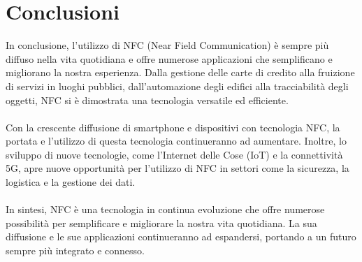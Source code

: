 \documentclass[a4paper,11pt]{report}
\begin{document}
\chapter{Conclusioni}
In conclusione, l'utilizzo di NFC (Near Field Communication) è sempre più diffuso nella vita quotidiana e offre numerose applicazioni che semplificano e migliorano la nostra esperienza. Dalla gestione delle carte di credito alla fruizione di servizi in luoghi pubblici, dall'automazione degli edifici alla tracciabilità degli oggetti, NFC si è dimostrata una tecnologia versatile ed efficiente.\\\\ Con la crescente diffusione di smartphone e dispositivi con tecnologia NFC, la portata e l'utilizzo di questa tecnologia continueranno ad aumentare. Inoltre, lo sviluppo di nuove tecnologie, come l'Internet delle Cose (IoT) e la connettività 5G, apre nuove opportunità per l'utilizzo di NFC in settori come la sicurezza, la logistica e la gestione dei dati.\\\\ In sintesi, NFC è una tecnologia in continua evoluzione che offre numerose possibilità per semplificare e migliorare la nostra vita quotidiana. La sua diffusione e le sue applicazioni continueranno ad espandersi, portando a un futuro sempre più integrato e connesso.
\end{document}
